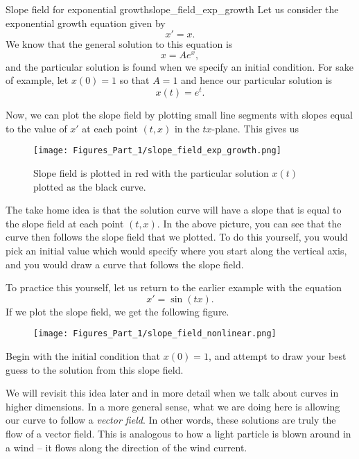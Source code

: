             \begin{ex}{Slope field for exponential growth}{slope_field_exp_growth}
                Let us consider the exponential growth equation given by
                \[
                x'=x.
                \]
                We know that the general solution to this equation is
                \[
                x=Ae^x,
                \]
                and the particular solution is found when we specify an initial condition. For sake of example, let $x(0)=1$ so that $A=1$ and hence our particular solution is
                \[
                x(t)=e^t.
                \]

                Now, we can plot the slope field by plotting small line segments with slopes equal to the value of $x'$ at each point $(t,x)$ in the $tx$-plane. This gives us
                \begin{figure}[H]
                    \centering
                    \texttt{[image: Figures\_Part\_1/slope\_field\_exp\_growth.png]}
                    \caption{Slope field is plotted in red with the particular solution $x(t)$ plotted as the black curve.}
                \end{figure}

                The take home idea is that the solution curve will have a slope that is equal to the slope field at each point $(t,x)$. In the above picture, you can see that the curve then follows the slope field that we plotted. To do this yourself, you would pick an initial value which would specify where you start along the vertical axis, and you would draw a curve that follows the slope field.
            \end{ex}

            To practice this yourself, let us return to the earlier example with the equation
            \[
            x'=\sin(tx).
            \]
            If we plot the slope field, we get the following figure.
            \begin{figure}[H]
                \centering
                \texttt{[image: Figures\_Part\_1/slope\_field\_nonlinear.png]}
            \end{figure}
            Begin with the initial condition that $x(0)=1$, and attempt to draw your best guess to the solution from this slope field.

            We will revisit this idea later and in more detail when we talk about curves in higher dimensions.  In a more general sense, what we are doing here is allowing our curve to follow a \emph{vector field}.  In other words, these solutions are truly the flow of a vector field.  This is analogous to how a light particle is blown around in a wind -- it flows along the direction of the wind current.



